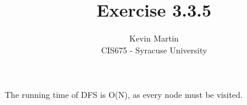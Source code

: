 \documentclass{article}
\author{Kevin Martin\\ CIS675 - Syracuse University}
\title{Exercise 3.3.5}
\begin{document}
\maketitle
The running time of DFS is O(N), as every node must be visited.
\end{document}
